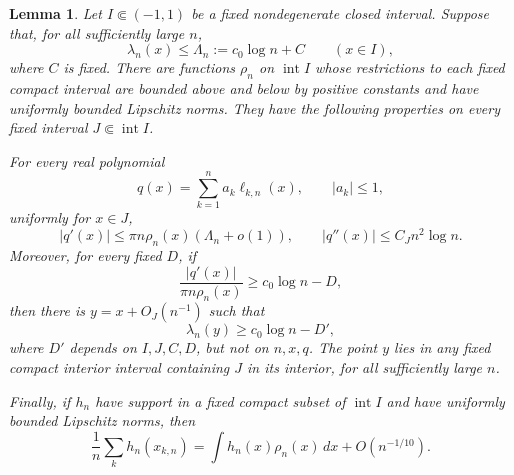 \documentclass[11pt]{article}
\newtheorem{lemma}[theorem]{Lemma}
\numberwithin{equation}{section}
\begin{document}
\begin{lemma}\label{lem:local}
Let \(I\Subset(-1,1)\) be a fixed nondegenerate closed interval. Suppose that,
for all sufficiently large \(n\),
\begin{equation}\label{eq:local-upper}
 \lambda_n(x)\le \Lambda_n:=c_0\log n+C\qquad(x\in I),
\end{equation}
where \(C\) is fixed. There are functions \(\rho_n\) on
\(\operatorname{int}I\) whose restrictions to each fixed compact interval are
bounded above and below by positive constants and have uniformly bounded
Lipschitz norms. They have the following properties on every fixed interval
\(J\Subset\operatorname{int}I\).

For every real polynomial
\[
 q(x)=\sum_{k=1}^n a_k\ell_{k,n}(x),\qquad |a_k|\le1,
\]
uniformly for \(x\in J\),
\begin{equation}\label{eq:derivative-bounds}
 |q'(x)|\le \pi n\rho_n(x)(\Lambda_n+o(1)),\qquad
 |q''(x)|\le C_Jn^2\log n.
\end{equation}
Moreover, for every fixed \(D\), if
\begin{equation}\label{eq:large-derivative}
 \frac{|q'(x)|}{\pi n\rho_n(x)}\ge c_0\log n-D,
\end{equation}
then there is \(y=x+O_J(n^{-1})\) such that
\begin{equation}\label{eq:nearby-peak}
 \lambda_n(y)\ge c_0\log n-D',
\end{equation}
where \(D'\) depends on \(I,J,C,D\), but not on \(n,x,q\). The point \(y\)
lies in any fixed compact interior interval containing \(J\) in its interior,
for all sufficiently large \(n\).

Finally, if \(h_n\) have support in a fixed compact subset of
\(\operatorname{int}I\) and have uniformly bounded Lipschitz norms, then
\begin{equation}\label{eq:quadrature}
 \frac1n\sum_k h_n(x_{k,n})
 =\int h_n(x)\rho_n(x)\,dx+O(n^{-1/10}).
\end{equation}

\end{lemma}
\end{document}
